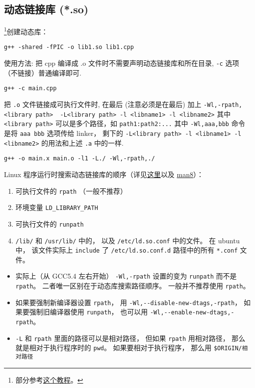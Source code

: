 \subsection{动态链接库 (*.so)}
\footnote{部分参考\href{https://amir.rachum.com/blog/2016/09/17/shared-libraries/}{这个教程}。}创建动态库：
\begin{lstlisting}[language=none]
g++ -shared -fPIC -o lib1.so lib1.cpp
\end{lstlisting}

使用方法:
把 cpp 编译成 .o 文件时不需要声明动态链接库和所在目录, \verb`-c` 选项（不链接）普通编译即可.
\begin{lstlisting}[language=none]
g++ -c main.cpp
\end{lstlisting}
把 \verb`.o` 文件链接成可执行文件时, 在最后 (注意必须是在最后) 加上
\verb`-Wl,-rpath,<library path>  -L<library path> -l <libname1> -l <libname2>` 其中 \verb`<library path>` 可以是多个路径，如 \verb`path1:path2:...`
其中 \verb`-Wl,aaa,bbb` 命令是将 \verb`aaa bbb` 选项传给 linker， 剩下的 \verb`-L<library path> -l <libname1> -l <libname2>` 的用法和上述 \verb`.a` 中的一样.

\begin{lstlisting}[language=none]
g++ -o main.x main.o -l1 -L./ -Wl,-rpath,./
\end{lstlisting}

Linux 程序运行时搜索动态链接库的顺序（详见\href{https://unix.stackexchange.com/questions/22926/where-do-executables-look-for-shared-objects-at-runtime}{这里}以及 \href{https://man7.org/linux/man-pages/man8/ld.so.8.html}{man8}）：
\begin{enumerate}
\item 可执行文件的 \verb`rpath` （一般不推荐）
\item 环境变量 \verb`LD_LIBRARY_PATH`
\item 可执行文件的 \verb`runpath`
\item \verb`/lib/` 和 \verb`/usr/lib/` 中的， 以及 \verb`/etc/ld.so.conf` 中的文件。 在 ubuntu 中， 该文件实际上 \verb`include` 了 \verb`/etc/ld.so.conf.d` 路径中的所有 \verb`*.conf` 文件。
\end{enumerate}

\begin{itemize}
\item 实际上（从 GCC5.4 左右开始） \verb`-Wl,-rpath` 设置的变为 \verb`runpath` 而不是 \verb`rpath`。 二者唯一区别在于动态库搜索路径顺序。 一般并不推荐使用 \verb`rpath`。
\item 如果要强制新编译器设置 \verb`rpath`， 用 \verb`-Wl,--disable-new-dtags,-rpath`， 如果要强制旧编译器使用 \verb`runpath`， 也可以用 \verb`-Wl,--enable-new-dtags,-rpath`。
\item \verb`-L` 和 \verb`rpath` 里面的路径可以是相对路径， 但如果 \verb`rpath` 用相对路径， 那么就是相对于执行程序时的 \verb`pwd`。 如果要相对于执行程序， 那么用 \verb`$ORIGIN/相对路径`
\end{itemize}


